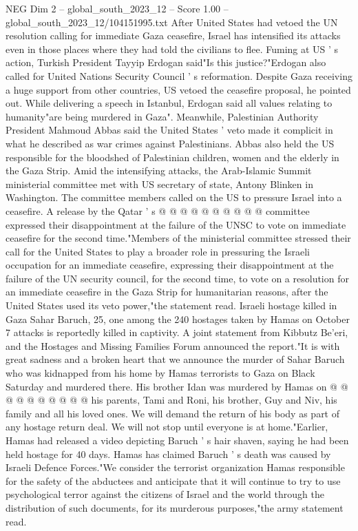\begin{textsample}{NEG Dim 2 – global\_south\_2023\_12 – Score 1.00 – global\_south\_2023\_12/104151995.txt}  \label{ex:f2_neg_291}
After United States had vetoed the UN resolution calling for immediate Gaza ceasefire, Israel has intensified its attacks even in those places where they had told the civilians to flee.
Fuming at US ' s action, Turkish President Tayyip Erdogan said"Is this justice?"Erdogan also called for United Nations Security Council ' s reformation.
Despite Gaza receiving a huge support from other countries, US vetoed the ceasefire proposal, he pointed out.
While delivering a speech in Istanbul, Erdogan said all values relating to humanity"are being murdered in Gaza".
Meanwhile, Palestinian Authority President Mahmoud Abbas said the United States ' veto made it complicit in what he described as war crimes against Palestinians.
Abbas also held the US responsible for the bloodshed of Palestinian children, women and the elderly in the Gaza Strip.
Amid the intensifying attacks, the Arab-Islamic Summit ministerial committee met with US secretary of state, Antony Blinken in Washington.
The committee members called on the US to pressure Israel into a ceasefire.
A release by the Qatar ' s @ @ @ @ @ @ @ @ @ @ committee expressed their disappointment at the failure of the UNSC to vote on immediate ceasefire for the second time."Members of the ministerial committee stressed their call for the United States to play a broader role in pressuring the Israeli occupation for an immediate ceasefire, expressing their disappointment at the failure of the UN security council, for the second time, to vote on a resolution for an immediate ceasefire in the Gaza Strip for humanitarian reasons, after the United States used its veto power,"the statement read.
Israeli hostage killed in Gaza Sahar Baruch, 25, one among the 240 hostages taken by Hamas on October 7 attacks is reportedly killed in captivity.
A joint statement from Kibbutz Be'eri, and the Hostages and Missing Families Forum announced the report."It is with great sadness and a broken heart that we announce the murder of Sahar Baruch who was kidnapped from his home by Hamas terrorists to Gaza on Black Saturday and murdered there.
His brother Idan was murdered by Hamas on @ @ @ @ @ @ @ @ @ @ his parents, Tami and Roni, his brother, Guy and Niv, his family and all his loved ones.
We will demand the return of his body as part of any hostage return deal.
We will not stop until everyone is at home."Earlier, Hamas had released a video depicting Baruch ' s hair shaven, saying he had been held hostage for 40 days.
Hamas has claimed Baruch ' s death was caused by Israeli Defence Forces."We consider the terrorist organization Hamas responsible for the safety of the abductees and anticipate that it will continue to try to use psychological terror against the citizens of Israel and the world through the distribution of such documents, for its murderous purposes,"the army statement read.

\end{textsample}

